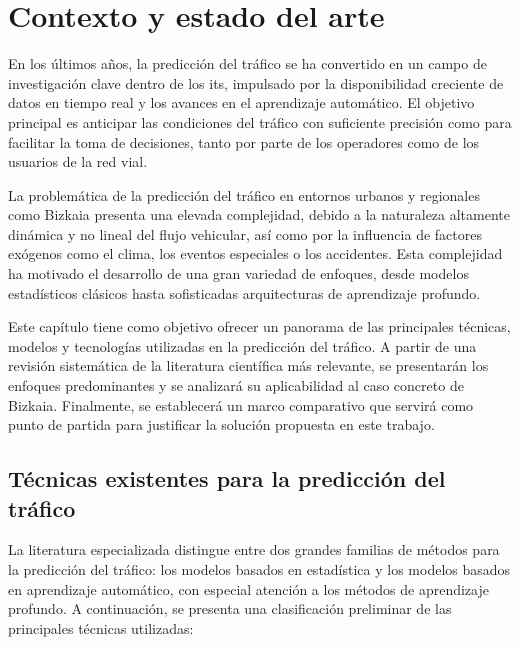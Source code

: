 \section*{Contexto y estado del arte}
\label{sec:ctx_estart}

En los últimos años, la predicción del tráfico se ha convertido en un campo de investigación clave dentro de los \acrlong{its}, impulsado por la disponibilidad creciente de datos en tiempo real y los avances en el aprendizaje automático. El objetivo principal es anticipar las condiciones del tráfico con suficiente precisión como para facilitar la toma de decisiones, tanto por parte de los operadores como de los usuarios de la red vial.

La problemática de la predicción del tráfico en entornos urbanos y regionales como Bizkaia presenta una elevada complejidad, debido a la naturaleza altamente dinámica y no lineal del flujo vehicular, así como por la influencia de factores exógenos como el clima, los eventos especiales o los accidentes. Esta complejidad ha motivado el desarrollo de una gran variedad de enfoques, desde modelos estadísticos clásicos hasta sofisticadas arquitecturas de aprendizaje profundo.

Este capítulo tiene como objetivo ofrecer un panorama de las principales técnicas, modelos y tecnologías utilizadas en la predicción del tráfico. A partir de una revisión sistemática de la literatura científica más relevante, se presentarán los enfoques predominantes y se analizará su aplicabilidad al caso concreto de Bizkaia. Finalmente, se establecerá un marco comparativo que servirá como punto de partida para justificar la solución propuesta en este trabajo.

\subsection{Técnicas existentes para la predicción del tráfico}

La literatura especializada distingue entre dos grandes familias de métodos para la predicción del tráfico: los modelos basados en estadística y los modelos basados en aprendizaje automático, con especial atención a los métodos de aprendizaje profundo. A continuación, se presenta una clasificación preliminar de las principales técnicas utilizadas:

